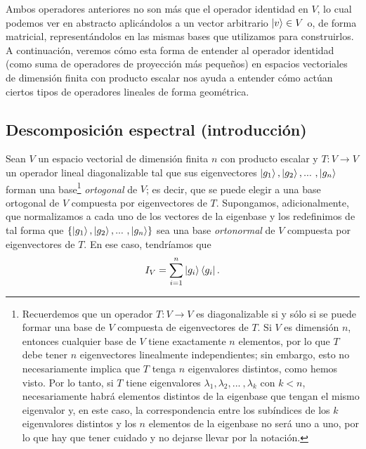 \documentclass[12pt,dvipsnames]{article}
\begin{document}
\vspace{3mm}
Ambos operadores anteriores no son más que el operador identidad en $V$, lo cual podemos ver en abstracto aplicándolos a un vector arbitrario $\ket{v}\in V$ o, de forma matricial, representándolos en las mismas bases que utilizamos para construirlos. A continuación, veremos cómo esta forma de entender al operador identidad (como suma de operadores de proyección más pequeños) en espacios vectoriales de dimensión finita con producto escalar nos ayuda a entender cómo actúan ciertos tipos de operadores lineales de forma geométrica. 

\subsection{Descomposición espectral (introducción)} \label{Subsec:Descomposición espectral (introducción)}

Sean $V$ un espacio vectorial de dimensión finita $n$ con producto escalar y $T:V\to V$ un operador lineal diagonalizable tal que sus eigenvectores $\ket{g_1},\ket{g_2},... \ ,\ket{g_n}$ forman una base\footnote{Recuerdemos que un operador $T:V\to V$ es diagonalizable si y sólo si se puede formar una base de $V$ compuesta de eigenvectores de $T$. Si $V$ es dimensión $n$, entonces cualquier base de $V$ tiene exactamente $n$ elementos, por lo que $T$ debe tener $n$ eigenvectores linealmente independientes; sin embargo, esto no necesariamente implica que $T$ tenga $n$ eigenvalores distintos, como hemos visto. Por lo tanto, si $T$ tiene eigenvalores $\lambda_1,\lambda_2,... \ ,\lambda_k$ con $k<n$, necesariamente habrá elementos distintos de la eigenbase que tengan el mismo eigenvalor y, en este caso, la correspondencia entre los subíndices de los $k$ eigenvalores distintos y los $n$ elementos de la eigenbase no será uno a uno, por lo que hay que tener cuidado y no dejarse llevar por la notación.} \emph{ortogonal} de $V$; es decir, que se puede elegir a una base ortogonal de $V$ compuesta por eigenvectores de $T$. Supongamos, adicionalmente, que normalizamos a cada uno de los vectores de la eigenbase y los redefinimos de tal forma que $\{\ket{g_1},\ket{g_2},... \ ,\ket{g_n}\}$ sea una base \emph{ortonormal} de $V$ compuesta por eigenvectores de $T$. En ese caso, tendríamos que \[
    I_V = \sum_{i=1}^n \ket{g_i}\bra{g_i}.
\] 
\end{document}

